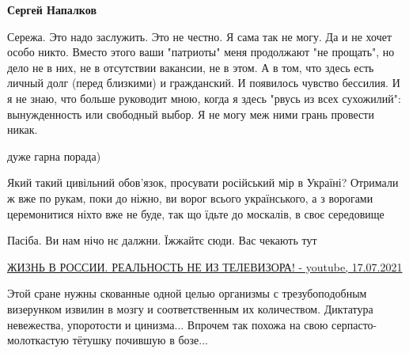 \begin{itemize}
\begin{itemize}
\textbf{Сергей Напалков} 

Сережа. Это надо заслужить. Это не честно. Я сама так не могу. Да и не хочет
особо никто. Вместо этого ваши "патриоты" меня продолжают "не прощать", но дело
не в них, не в отсутствии вакансии, не в этом. А в том, что здесь есть личный
долг (перед близкими) и гражданский. И появилось чувство бессилия. И я не знаю,
что больше руководит мною, когда я здесь "рвусь из всех сухожилий":
вынужденность или свободный выбор. Я не могу меж ними грань провести никак.


 

дуже гарна порада)

 

Який такий цивільний обов'язок, просувати російський мір в Україні? Отримали ж
вже по рукам, поки до ніжно, ви ворог всього українського, а з ворогами
церемонитися ніхто вже не буде, так що їдьте до москалів, в своє середовище

 
Пасіба. Ви нам нічо нє далжни. Їжжайтє сюди. Вас чекають тут

\href{https://youtu.be/mpMWEAGzN-o}{%
ЖИЗНЬ В РОССИИ. РЕАЛЬНОСТЬ НЕ ИЗ ТЕЛЕВИЗОРА! - youtube, 17.07.2021}

\end{itemize}

 

Этой сране нужны скованные одной целью организмы с трезубоподобным визерунком
извилин в мозгу и соответственным их количеством. Диктатура невежества,
упоротости и цинизма... Впрочем так похожа на свою серпасто-молоткастую тётушку
почившую в бозе...


\end{itemize}
